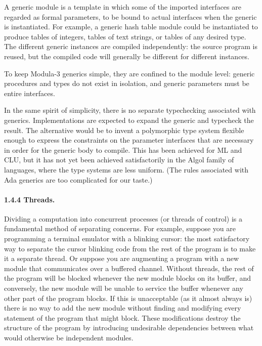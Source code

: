 \documentclass[10pt]{article}
\begin{document}
A generic module is a template in which some of the imported interfaces are
regarded as formal parameters, to be bound to actual interfaces when the
generic is instantiated.  For example, a generic hash table module could be
instantiated to produce tables of integers, tables of text strings, or tables
of any desired type.  The different generic instances are compiled
independently: the source program is reused, but the compiled code will
generally be different for different instances.

To keep Modula-3 generics simple, they are confined to the module level:
generic procedures and types do not exist in isolation, and generic parameters
must be entire interfaces.

In the same spirit of simplicity, there is no separate typechecking associated
with generics.  Implementations are expected to expand the generic and
typecheck the result.  The alternative would be to invent a polymorphic type
system flexible enough to express the constraints on the parameter interfaces
that are necessary in order for the generic body to compile.  This has been
achieved for ML and CLU, but it has not yet been achieved satisfactorily in
the Algol family of languages, where the type systems are less uniform.  (The
rules associated with Ada generics are too complicated for our taste.)

\paragraph{1.4.4 Threads.}

Dividing a computation into concurrent processes (or threads of control) is a
fundamental method of separating concerns.  For example, suppose you are
programming a terminal emulator with a blinking cursor: the most satisfactory
way to separate the cursor blinking code from the rest of the program is to
make it a separate thread.  Or suppose you are augmenting a program with a new
module that communicates over a buffered channel.  Without threads, the rest
of the program will be blocked whenever the new module blocks on its buffer,
and conversely, the new module will be unable to service the buffer whenever
any other part of the program blocks.  If this is unacceptable (as it almost
always is) there is no way to add the new module without finding and modifying
every statement of the program that might block.  These modifications destroy
the structure of the program by introducing undesirable dependencies between
what would otherwise be independent modules.
\end{document}

